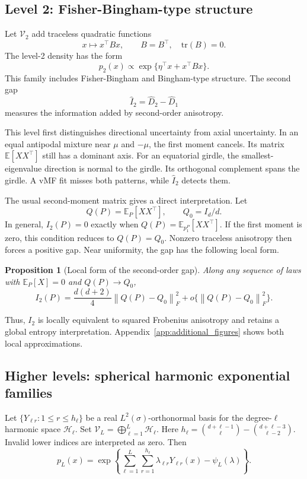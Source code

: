 \documentclass[twoside]{article}
\newtheorem{proposition}[theorem]{Proposition}
\theoremstyle{definition}
\theoremstyle{remark}
\newcommand{\V}{\mathcal V}
\newcommand{\E}{\mathbb E}
\newcommand{\tr}{\mathrm{tr}}
\newcommand{\norm}[1]{\left\lVert #1\right\rVert}
\begin{document}
\subsection{Level 2: Fisher-Bingham-type structure}

Let $\V_2$ add traceless quadratic functions
\[
  x\mapsto x^\top Bx,
  \qquad B=B^\top,\quad \tr(B)=0.
\]
The level-2 density has the form
\[
  p_2(x)\propto \exp\{\eta^\top x+x^\top Bx\}.
\]
This family includes Fisher-Bingham and Bingham-type structure. The second gap
\[
  \widehat I_2=\widehat D_2-\widehat D_1
\]
measures the information added by second-order anisotropy.

This level first distinguishes directional uncertainty from axial uncertainty. In an equal antipodal mixture near $\mu$ and $-\mu$, the first moment cancels. Its matrix $\E[XX^\top]$ still has a dominant axis. For an equatorial girdle, the smallest-eigenvalue direction is normal to the girdle. Its orthogonal complement spans the girdle. A vMF fit misses both patterns, while $\widehat I_2$ detects them.

The usual second-moment matrix gives a direct interpretation. Let
\[
  Q(P)=\E_P[XX^\top],\qquad Q_0=I_d/d.
\]
In general, $I_2(P)=0$ exactly when $Q(P)=\E_{p_1^P}[XX^\top]$. If the first moment is zero, this condition reduces to $Q(P)=Q_0$. Nonzero traceless anisotropy then forces a positive gap. Near uniformity, the gap has the following local form.

\begin{proposition}[Local form of the second-order gap]
\label{prop:I2_local}
Along any sequence of laws with $\E_P[X]=0$ and $Q(P)\to Q_0$,
\[
  I_2(P)=\frac{d(d+2)}{4}\norm{Q(P)-Q_0}_F^2
  +o\{\norm{Q(P)-Q_0}_F^2\}.
\]
\end{proposition}
Thus, $I_2$ is locally equivalent to squared Frobenius anisotropy and retains a global entropy interpretation. Appendix~\ref{app:additional_figures} shows both local approximations.


\subsection{Higher levels: spherical harmonic exponential families}

Let $\{Y_{\ell r}:1\le r\le h_\ell\}$ be a real $L^2(\sigma)$-orthonormal basis for the degree-$\ell$ harmonic space $\mathcal H_\ell$. Set
$
  \V_L=\bigoplus_{\ell=1}^L \mathcal H_\ell.
$ Here $h_\ell=\binom{d+\ell-1}{\ell}-\binom{d+\ell-3}{\ell-2}$. Invalid lower indices are interpreted as zero. Then
\[
  p_L(x)=\exp\left\{\sum_{\ell=1}^L\sum_{r=1}^{h_\ell}\lambda_{\ell r}Y_{\ell r}(x)-\psi_L(\lambda)\right\}.
\]
\end{document}
